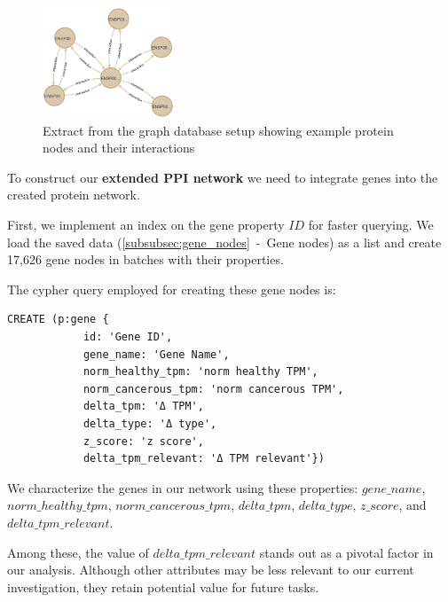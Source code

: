 \begin{figure}[h]
    \centering
    \includegraphics[width=0.35\textwidth]{figures/03_03_Basic_Network}
    \caption{Extract from the graph database setup showing example protein nodes and their interactions}
    \label{fig:03_03_Basic_Network}
\end{figure}
\vspace{\baselineskip}


To construct our \textbf{extended PPI network} we need to integrate genes into the created protein network.

First, we implement an index on the gene property $ID$ for faster querying.
We load the saved data (\ref{subsubsec:gene_nodes}~-~Gene nodes) as a list and create 17,626 gene nodes
in batches with their properties.

The cypher query employed for creating these gene nodes is:
\begin{lstlisting}[language=Cypher, label={lst:gene_nodes}]
    CREATE (p:gene {
            id: 'Gene ID',
            gene_name: 'Gene Name',
            norm_healthy_tpm: 'norm healthy TPM',
            norm_cancerous_tpm: 'norm cancerous TPM',
            delta_tpm: 'Δ TPM',
            delta_type: 'Δ type',
            z_score: 'z score',
            delta_tpm_relevant: 'Δ TPM relevant'})
\end{lstlisting}

We characterize the genes in our network using these properties:
$gene\_name$, $norm\_healthy\_tpm$, $norm\_cancerous\_tpm$, $delta\_tpm$, $delta\_type$, $z\_score$, and $delta\_tpm\_relevant$.


Among these, the value of $delta\_tpm\_relevant$ stands out as a pivotal factor in our analysis.
Although other attributes may be less relevant to our current investigation, they retain potential value for future tasks.\\

